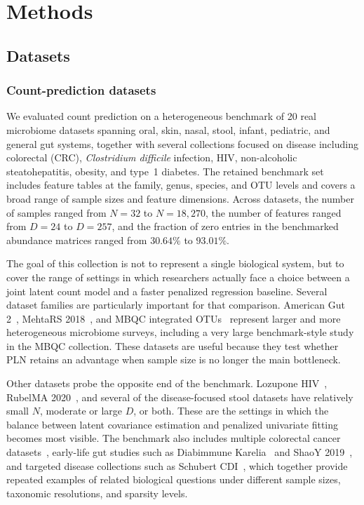 \documentclass[Review,doublespace,sageh,times]{sagej}
\begin{document}
\section{Methods}
\subsection{Datasets}
\subsubsection{Count-prediction datasets}
\label{subsec:count-prediction-datasets}
We evaluated count prediction on a heterogeneous benchmark of 20 real microbiome datasets spanning oral, skin, nasal, stool, infant, pediatric, and general gut systems, together with several collections focused on disease including colorectal  (CRC), \textit{Clostridium difficile} infection, HIV, non-alcoholic steatohepatitis, obesity, and type~1 diabetes.
The retained benchmark set includes feature tables at the family, genus, species, and OTU levels and covers a broad range of sample sizes and feature dimensions.
Across datasets, the number of samples ranged from $N=32$ to $N=18{,}270$, the number of features ranged from $D=24$ to $D=257$, and the fraction of zero entries in the benchmarked abundance matrices ranged from $30.64\%$ to $93.01\%$.

The goal of this collection is not to represent a single biological system, but to cover the range of settings in which researchers actually face a choice between a joint latent count model and a faster penalized regression baseline.
Several dataset families are particularly important for that comparison.
American Gut 2~\citep{McDonald2018}, MehtaRS 2018~\citep{Mehta2018}, and MBQC integrated OTUs~\citep{MBQC2017} represent larger and more heterogeneous microbiome surveys, including a very large benchmark-style study in the MBQC collection.
These datasets are useful because they test whether PLN retains an advantage when sample size is no longer the main bottleneck.

Other datasets probe the opposite end of the benchmark.
Lozupone HIV~\citep{Lozupone2013}, RubelMA 2020~\citep{Rubel2020}, and several of the disease-focused stool datasets have relatively small $N$, moderate or large $D$, or both.
These are the settings in which the balance between latent covariance estimation and penalized univariate fitting becomes most visible.
The benchmark also includes multiple colorectal cancer datasets~\citep{Yu2015, Baxter2016, Zeller2014}, early-life gut studies such as Diabimmune Karelia~\citep{Vatanen2016} and ShaoY 2019~\citep{Shao2019}, and targeted disease collections such as Schubert CDI~\citep{Schubert2014}, which together provide repeated examples of related biological questions under different sample sizes, taxonomic resolutions, and sparsity levels.
\end{document}
